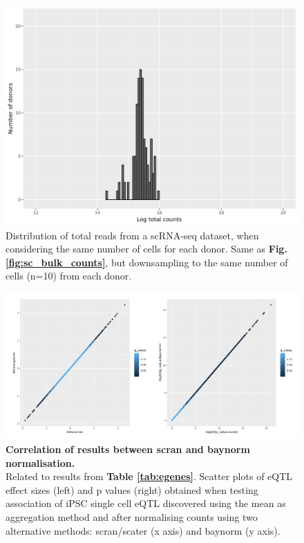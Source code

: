 \begin{figure}[h]
    \centering
    \includegraphics[width=12cm]{Appendix2/Fig/suppl_distribution_fixed_ncells.png}
    \caption[Distribution of total reads scRNA-seq same number of cells per donor]{Distribution of total reads from a scRNA-seq dataset, when considering the same number of cells for each donor.
    Same as \textbf{Fig. \ref{fig:sc_bulk_counts}}, but downsampling to the same number of cells (n=10) from each donor.}
    \label{suppl_fig:counts_sc_ncells}
\end{figure}

\begin{figure}[h]
    \centering
    \includegraphics[width=16cm]{Appendix2/Fig/suppl_scran_vs_baynorm.png}
    \caption[Correlation of results between scran and baynorm normalisation]{\textbf{Correlation of results between scran and baynorm normalisation.}\\
    Related to results from \textbf{Table \ref{tab:egenes}}.
    Scatter plots of eQTL effect sizes (left) and p values (right) obtained when testing association of iPSC single cell eQTL discovered using the mean as aggregation method and after normalising counts using two alternative methods: scran/scater \cite{mccarthy2017scater} (x axis) and baynorm \cite{tang2020baynorm} (y axis).}
    \label{suppl_fig:scran_vs_baynorm}
\end{figure}

